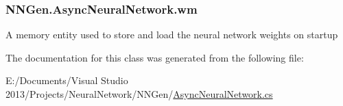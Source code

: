 \subsubsection[{wm}]{ N\+N\+Gen.\+Async\+Neural\+Network.\+wm\hspace{0.3cm}{\ttfamily [get]}}\label{class_n_n_gen_1_1_async_neural_network_a94241380da2839193000b7c3e78fe8cd}


A memory entity used to store and load the neural network weights on startup 



The documentation for this class was generated from the following file\+:\begin{DoxyCompactItemize}
\item 
E\+:/\+Documents/\+Visual Studio 2013/\+Projects/\+Neural\+Network/\+N\+N\+Gen/\hyperlink{_async_neural_network_8cs}{Async\+Neural\+Network.\+cs}\end{DoxyCompactItemize}
